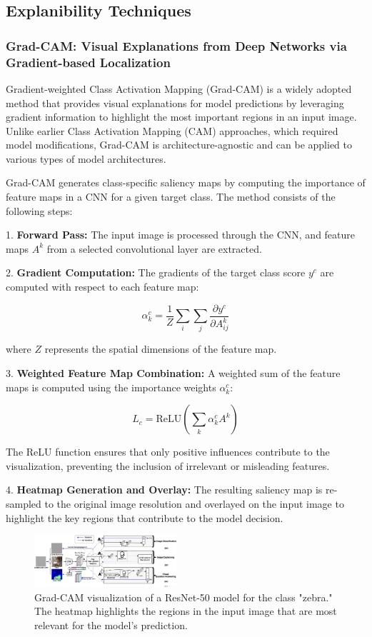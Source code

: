 \subsection{Explanibility Techniques}
\subsubsection{Grad-CAM: Visual Explanations from Deep Networks via Gradient-based Localization}

Gradient-weighted Class Activation Mapping (Grad-CAM)\cite{Selvaraju_2017_ICCV} is a widely adopted method that provides visual explanations for model predictions by leveraging gradient information to highlight the most important regions in an input image. Unlike earlier Class Activation Mapping (CAM) approaches, which required model modifications, Grad-CAM is architecture-agnostic and can be applied to various types of model architectures.

Grad-CAM generates class-specific saliency maps by computing the importance of feature maps in a CNN for a given target class. The method consists of the following steps:

1. \textbf{Forward Pass:} The input image is processed through the CNN, and feature maps \(A^k\) from a selected convolutional layer are extracted.

2. \textbf{Gradient Computation:} The gradients of the target class score \(y^c\) are computed with respect to each feature map:

   $$
   \alpha_k^c = \frac{1}{Z} \sum_i \sum_j \frac{\partial y^c}{\partial A^k_{ij}}
   $$

   where \(Z\) represents the spatial dimensions of the feature map.

3. \textbf{Weighted Feature Map Combination:} A weighted sum of the feature maps is computed using the importance weights \(\alpha_k^c\):

   $$
   L_c = \text{ReLU} \left( \sum_k \alpha_k^c A^k \right)
   $$

   The ReLU function ensures that only positive influences contribute to the visualization, preventing the inclusion of irrelevant or misleading features.

4. \textbf{Heatmap Generation and Overlay:} The resulting saliency map is re-sampled to the original image resolution and overlayed on the input image to highlight the key regions that contribute to the model decision.

\begin{figure}[h]
    \centering
    \includegraphics[width=0.47\textwidth]{./images/Grad-CAM_approach.png}
    \caption{Grad-CAM visualization of a ResNet-50 model for the class "zebra." The heatmap highlights the regions in the input image that are most relevant for the model's prediction.}
    \label{fig:gradcam}
\end{figure}

